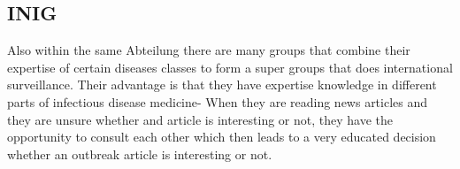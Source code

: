 \subsection{INIG}
Also within the same Abteilung there are many groups that combine their
expertise of certain diseases classes to form a super groups that does international
surveillance. Their advantage is that they have expertise knowledge in different
parts of infectious disease medicine- When they are reading news articles and they
are unsure whether and article is interesting or not, they have the opportunity
to consult each other which then leads to a very educated decision whether an
outbreak article is interesting or not.


